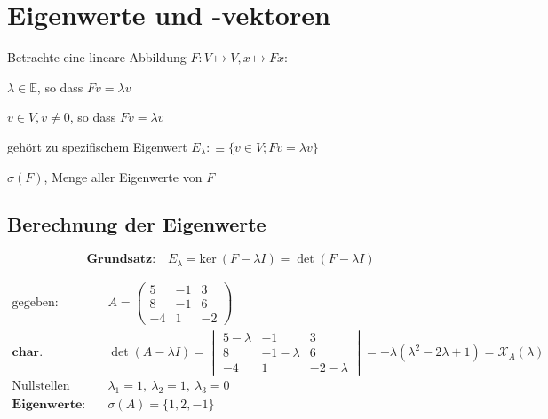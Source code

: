 \documentclass[11pt]{article}
\begin{document}
\section{Eigenwerte und -vektoren}

Betrachte eine lineare Abbildung $F: V \mapsto V, x \mapsto Fx$:
\begin{description}[labelindent=16pt,style=multiline,leftmargin=3.5cm, noitemsep]
	\item[Eigenwert] $\lambda \in \mathbb{E}$, so dass $Fv = \lambda v$
	\item[Eigenvektor] $v \in V, v \neq 0$, so dass $Fv = \lambda v$
	\item[Eigenraum] geh{\"o}rt zu spezifischem Eigenwert $E_\lambda :\equiv \{v \in V; Fv = \lambda v\}$
	\item[Spektrum] $\sigma(F)$, Menge aller Eigenwerte von $F$
\end{description}

\subsection{Berechnung der Eigenwerte}

\begin{equation*}
	\textbf{Grundsatz:} \quad E_\lambda = \text{ker}\ (F - \lambda I) = \det(F - \lambda I)
\end{equation*}

\begin{equation*}
\begin{split}
	\text{gegeben:} & \quad A = \begin{pmatrix}
		5 & -1 & 3 \\ 8 & -1 & 6 \\ -4 & 1 & -2
	\end{pmatrix} \\
	\textbf{char. Polynom:} & \quad \det(A - \lambda I) = \begin{vmatrix}
		5 - \lambda & -1 & 3 \\ 8 & -1 - \lambda & 6 \\ -4 & 1 & -2-\lambda
	\end{vmatrix} = -\lambda(\lambda^2- 2\lambda+1) = \mathcal{X}_A(\lambda) \\
	\text{Nullstellen finden:} & \quad \lambda_1 = 1,\ \lambda_2 = 1,\ \lambda_3 = 0 \\
	\textbf{Eigenwerte:} & \quad \sigma(A) = \{1, 2, -1\}
\end{split}
\end{equation*}
\end{document}

